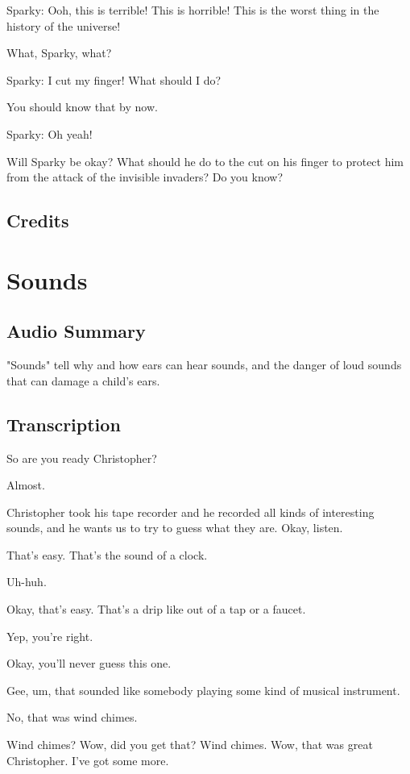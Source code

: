 Sparky: Ooh, this is terrible! This is horrible! This is the worst thing in the history of the universe!

What, Sparky, what?

Sparky: I cut my finger! What should I do?

You should know that by now.

Sparky: Oh yeah!

Will Sparky be okay? What should he do to the cut on his finger to protect him from the attack of the invisible invaders? Do you know?

\subsection{Credits}

\section{Sounds}

\subsection{Audio Summary}

"Sounds" tell why and how ears can hear sounds, and the danger of loud sounds that can damage a child's ears.

\subsection{Transcription}

So are you ready Christopher?

Almost.

Christopher took his tape recorder and he recorded all kinds of interesting sounds, and he wants us to try to guess what they are. Okay, listen.

That's easy. That's the sound of a clock.

Uh-huh.

Okay, that's easy. That's a drip like out of a tap or a faucet.

Yep, you're right.

Okay, you'll never guess this one.

Gee, um, that sounded like somebody playing some kind of musical instrument.

No, that was wind chimes.

Wind chimes? Wow, did you get that? Wind chimes. Wow, that was great Christopher. I've got some more.

